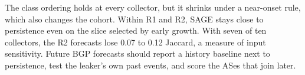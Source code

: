 The class ordering holds at every collector, but it shrinks under a near-onset rule, which also changes the cohort.
Within R1 and R2, SAGE stays close to persistence even on the slice selected by early growth.
With seven of ten collectors, the R2 forecasts lose 0.07 to 0.12 Jaccard, a measure of input sensitivity.
Future BGP forecasts should report a history baseline next to persistence, test the leaker's own past events, and score the ASes that join later.

